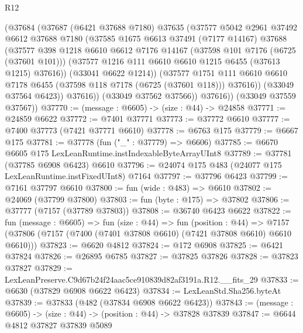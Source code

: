 \begin{lexlean}{R12}
\begin{coremodule}
              (@37684
                (@37687
                  (@6421 @37688 @7180)
                  @37635
                  (@37577
                    @5042
                    @2961
                    @37492
                    @6612
                    @37688
                    @7180
                    (@37585
                      @1675
                      @6613
                      @37491
                      (@7177 @14167)
                      @37688
                      (@37577
                        @398
                        @1218
                        @6610
                        @6612
                        @7176
                        @14167
                        (@37598 @101 @7176 (@6725 (@37601 @101)))
                        (@37577 @1216 @111 @6610 @6610 @1215 @6455 (@37613 @1215) @37616))
                      (@33041 @6622 @1214))
                    (@37577
                      @1751
                      @111
                      @6610
                      @6610
                      @7178
                      @6455
                      (@37598 @118 @7178 (@6725 (@37601 @118)))
                      @37616))
                  (@33049 @37564 @6423))
                @37616))
            (@33049 @37562 @37566))
          @37616))
      (@33049 @37559 @37567))
@37770 := (message : @6605) -> (size : @44) -> @24858
@37771 := @24859 @6622
@37772 := @7401 @37771
@37773 := @37772 @6610
@37777 := @7400 @37773 (@7421 @37771 @6610)
@37778 := @6763 @175
@37779 := @6667 @175
@37781 := @37778 (fun ("_" : @37779) => @6606)
@37785 := @6670 @6605 @175 LexLeanRuntime.instIndexableByteArrayUInt8
@37789 := @37781 (@37785 @6908 @6423) @6610
@37796 := @24074 @175 @483 (@24077 @175 LexLeanRuntime.instFixedUInt8) @7164
@37797 := @37796 @6423
@37799 := @7161 @37797 @6610
@37800 := fun (wide : @483) => @6610
@37802 := @24069 (@37799 @37800)
@37803 := fun (byte : @175) => @37802
@37806 := @37777 (@7157 (@37789 @37803))
@37808 := @36740 @6423 @6622
@37822 := fun (message : @6605) =>
  fun (size : @44) =>
  fun (position : @44) =>
  @7157 (@37806 (@7157 (@7400 (@7401 @37808 @6610) (@7421 @37808 @6610) @6610 @6610)))
@37823 := @6620 @4812
@37824 := @172 @6908
@37825 := @6421 @37824
@37826 := @26895 @6785
@37827 := @37825 @37826
@37828 := @37823 @37827
@37829 := LexLeanPreserve.C9d67b24f24aac5ce910839d82af3191a.R12.__fits_29
@37833 := @6630 (@37829 @6908 @6622 @6423)
@37834 := LexLeanStd.Sha256.byteAt
@37839 := @37833 (@482 (@37834 @6908 @6622 @6423))
@37843 := (message : @6605) -> (size : @44) -> (position : @44) -> @37828 @37839
@37847 := @6644 @4812 @37827 @37839 @5089

\end{coremodule}
\end{lexlean}
